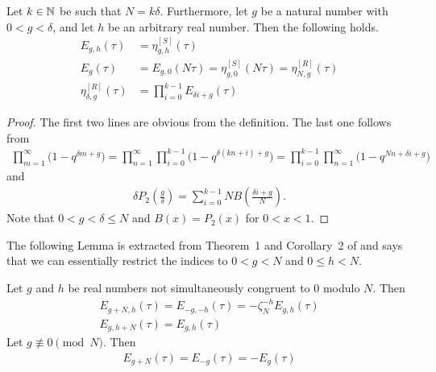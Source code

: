 \documentclass{article}
\begin{document}
\begin{Lemma}
  Let $k\in\mathbb{N}$ be such that $N=k \delta$. Furthermore, let $g$ be a
  natural number with $0 < g < \delta$, and let $h$ be an arbitrary
  real number. Then the following holds.
  \begin{align}
    E_{g,h}(\tau) &= \eta_{g,h}^{[S]}(\tau)
    \\
    E_g(\tau)
    &=
      E_{g,0}(N \tau)
      =
      \eta_{g,0}^{[S]}(N \tau)
      =
      \eta_{N,g}^{[R]}(\tau)
    \\
    \eta_{\delta,g}^{[R]}(\tau)
    &=
    \prod_{i=0}^{k-1} E_{\delta i + g}(\tau)
  \end{align}
\end{Lemma}
\begin{proof}
  The first two lines are obvious from the definition.
  The last one follows from
  \begin{gather*}
    \prod_{m=1}^\infty \bigl(1-q^{\delta m + g}\bigr) =
    \prod_{n=1}^\infty \prod_{i=0}^{k-1} \bigl(1-q^{\delta (k n + i) + g}\bigr) =
    \prod_{i=0}^{k-1} \prod_{n=1}^\infty \bigl(1-q^{N n + \delta i + g}\bigr)
  \end{gather*}
  and
  \begin{gather*}
    \delta P_2\left(\frac{g}{\delta}\right)
    =
    \sum_{i=0}^{k-1}N B\left(\frac{\delta i + g}{N}\right).
  \end{gather*}
  Note that $0<g<\delta \le N$ and $B(x)=P_2(x)$ for $0<x<1$.
\end{proof}

The following Lemma is extracted from Theorem~1 and Corollary~2 of
\cite{Yang:GeneralizedDedekindEtaFunctions:2004} and says that we can
essentially restrict the indices to $0<g<N$ and $0\le h<N$.


\begin{Lemma}[Yang]
  \label{thm:modular-Yang-E}
  Let $g$ and $h$ be real numbers not simultaneously congruent to 0
  modulo $N$. Then
  \begin{gather}
    E_{g+N,h}(\tau) = E_{-g,-h}(\tau) = -\zeta_N^{-h} E_{g,h}(\tau)\\
    E_{g,h+N}(\tau) = E_{g, h}(\tau)
  \end{gather}
  Let $g \not\equiv 0 \pmod{N}$. Then
  \begin{gather}
    E_{g+N}(\tau) = E_{-g}(\tau) = - E_g(\tau)
  \end{gather}
\end{Lemma}
\end{document}

